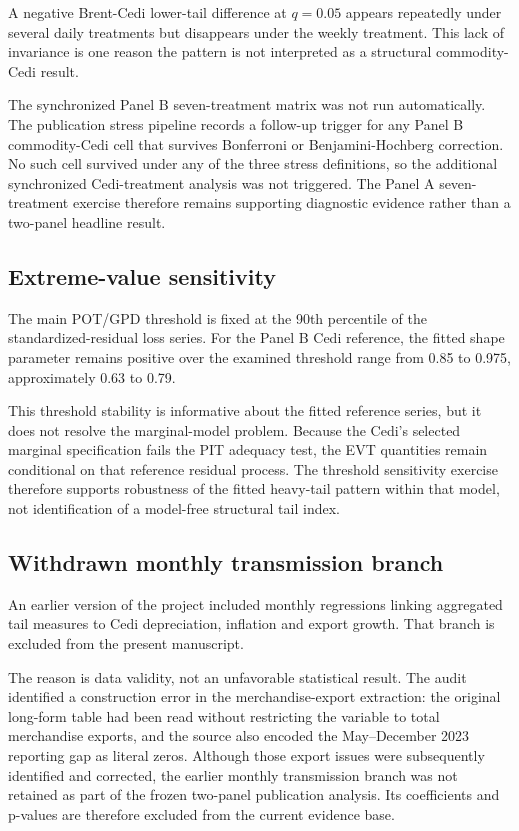 A negative Brent-Cedi lower-tail difference at \(q=0.05\) appears repeatedly under several daily treatments but disappears under the weekly treatment. This lack of invariance is one reason the pattern is not interpreted as a structural commodity-Cedi result.

The synchronized Panel B seven-treatment matrix was not run automatically. The publication stress pipeline records a follow-up trigger for any Panel B commodity-Cedi cell that survives Bonferroni or Benjamini-Hochberg correction. No such cell survived under any of the three stress definitions, so the additional synchronized Cedi-treatment analysis was not triggered. The Panel A seven-treatment exercise therefore remains supporting diagnostic evidence rather than a two-panel headline result.

\subsection{Extreme-value sensitivity}

The main POT/GPD threshold is fixed at the 90th percentile of the standardized-residual loss series. For the Panel B Cedi reference, the fitted shape parameter remains positive over the examined threshold range from 0.85 to 0.975, approximately 0.63 to 0.79.

This threshold stability is informative about the fitted reference series, but it does not resolve the marginal-model problem. Because the Cedi's selected marginal specification fails the PIT adequacy test, the EVT quantities remain conditional on that reference residual process. The threshold sensitivity exercise therefore supports robustness of the fitted heavy-tail pattern within that model, not identification of a model-free structural tail index.

\subsection{Withdrawn monthly transmission branch}

An earlier version of the project included monthly regressions linking aggregated tail measures to Cedi depreciation, inflation and export growth. That branch is excluded from the present manuscript.

The reason is data validity, not an unfavorable statistical result. The audit identified a construction error in the merchandise-export extraction: the original long-form table had been read without restricting the variable to total merchandise exports, and the source also encoded the May--December 2023 reporting gap as literal zeros. Although those export issues were subsequently identified and corrected, the earlier monthly transmission branch was not retained as part of the frozen two-panel publication analysis. Its coefficients and p-values are therefore excluded from the current evidence base.

